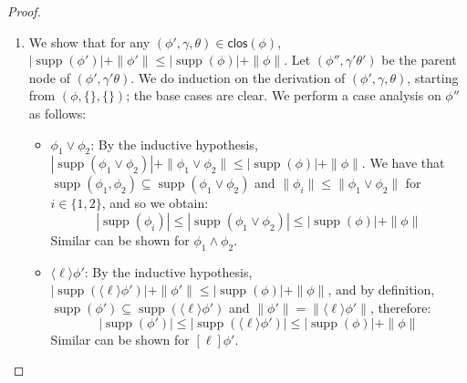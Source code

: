 \documentclass[10pt,a4paper]{article}
\theoremstyle{definition}
\theoremstyle{remark}
\DeclareMathOperator{\supp}{supp}
\newcommand\diam[1]{\langle#1\rangle}
\newcommand\sq[1]{[#1]}
\newcommand\Ncal{\mathcal{N}}
\newcommand\orb[1][]{\mathcal{O}_{#1}}
\newcommand{\clos}[0]{\mathsf{clos}}
\begin{document}
\begin{proof}
\begin{enumerate}
\begin{itemize}
\[			\]
			and by Lemma~\ref{lem:unionOrb2}:
						\[
			\orb[\Ncal](\clos_\phi((\mu X(\vec x).\psi')(\vec a),\gamma, \theta)) \subseteq \{((\mu X(\vec x).\psi')(\vec a),\gamma, \theta)\} \cup \orb[\Ncal](\clos_\phi(\hat \psi,(\gamma, \{\vec a/\vec x\}), \theta'))
			\]
			By the inductive hypothesis, we have:
			\[
			|\orb[\Ncal](\clos_\phi(\hat \psi,(\gamma, \{\vec a/\vec x\}) \theta'))| \le |\hat \psi|\cdot m'   (\hat \psi,(\gamma, \{\vec a/\vec x\}),\theta')
			\]
			We note that
			$m'(\hat \psi,(\gamma, \{\vec a/\vec x\}),\theta') = m'(\psi,\gamma,\theta)$, thus obtaining:
						\begin{align*}
				|\orb[\Ncal](\clos_\phi(\psi,\gamma, \theta))| &\le |\orb[\Ncal](\clos_\phi(\hat \psi,(\gamma, \{\vec a/\vec x\})\theta'))| + 1
				\\ &\overset{\text{IH}}{\le} |\hat \psi|\cdot m'(\hat \psi) + 1
				\\ &\leq (|\vec x| + |\psi'|)\cdot m'(\psi,\gamma,\theta) + 1
				\leq |\psi|\cdot m'(\psi,\gamma,\theta)
			\end{align*}
			A similar argument can be shown for $(\nu X(\vec x).\psi')(\vec a)$.
		\end{itemize}
		\item    We show that for any $(\phi',\gamma, \theta) \in \clos(\phi)$, $|\supp(\phi')| + \|\phi'\| \le |\supp(\phi)| + \|\phi\|$.
				Let $(\phi'',\gamma'\theta')$ be the parent node of $(\phi',\gamma' \theta)$.
		We do induction on the derivation of $(\phi',\gamma, \theta)$, starting from $(\phi,\{\}, \{\})$; the base cases are clear.
		We perform a case analysis on $\phi''$ as follows:
		\begin{itemize}
			\item $\phi_1 \lor \phi_2$: 
			By the inductive hypothesis, $|\supp(\phi_1 \lor \phi_2)| + \|\phi_1 \lor \phi_2\| \le |\supp(\phi)| + \|\phi\|$. 
			We have that $\supp(\phi_1,\phi_2) \subseteq \supp(\phi_1 \lor \phi_2)$ and $\|\phi_i\| \le \|\phi_1 \lor \phi_2\|$ for $i \in \{1,2\}$, and so we obtain:
			\[
			|\supp(\phi_i)| \le |\supp(\phi_1 \lor \phi_2)| \le  |\supp(\phi)| + \|\phi\|
			\]
			Similar can be shown for $\phi_1 \land \phi_2$.
						\item $\diam{\ell} \phi'$: By the inductive hypothesis, $|\supp(\diam{\ell}\phi')| + \|\phi'\| \le |\supp(\phi)| + \|\phi\|$, and by definition, $\supp(\phi')\subseteq \supp(\diam{\ell}\phi')$ and $\|\phi'\| = \|\diam{\ell}\phi'\|$, therefore:
			\[
			|\supp(\phi')| \le |\supp(\diam{\ell}\phi')| \le |\supp(\phi)| + \|\phi\|
			\]
			Similar can be shown for $\sq{\ell} \phi'$.

\end{itemize}
\end{enumerate}
\end{proof}
\end{document}
